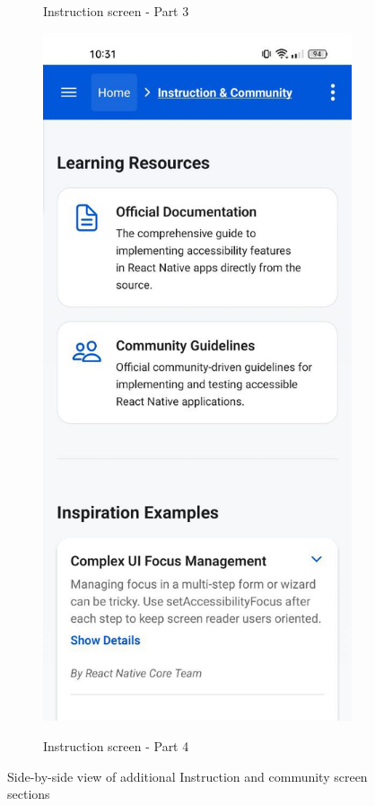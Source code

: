 \begin{figure}[ht]
\begin{subfigure}[b]{0.48\textwidth}
        \caption{Instruction screen - Part 3}
        \label{fig:instruction-left2}
    \end{subfigure}
    \hfill
    \begin{subfigure}[b]{0.48\textwidth}
        \centering
        \includegraphics[width=\linewidth, alt={Fourth part of the Instruction and community screen}]{img/instruction4.jpg}
        \caption{Instruction screen - Part 4}
        \label{fig:instruction-right2}
    \end{subfigure}
    \caption{Side-by-side view of additional Instruction and community screen sections}
    \label{fig:instruction_screens_sidebyside2}
\end{figure}

